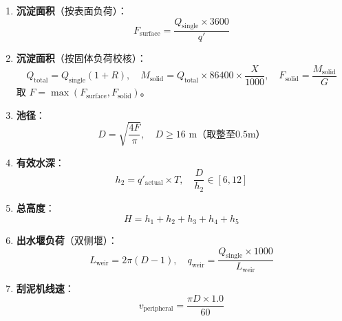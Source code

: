 \documentclass[12pt,a4paper]{ctexart}
\begin{document}
\begin{enumerate}[label=(\arabic*), leftmargin=*]
    \item \textbf{沉淀面积}（按表面负荷）：
    \begin{equation}
        F_{\text{surface}} = \frac{Q_{\text{single}} \times 3600}{q'}
    \end{equation}

    \item \textbf{沉淀面积}（按固体负荷校核）：
    \begin{equation}
        Q_{\text{total}} = Q_{\text{single}}(1 + R), \quad
        M_{\text{solid}} = Q_{\text{total}} \times 86400 \times \frac{X}{1000}, \quad
        F_{\text{solid}} = \frac{M_{\text{solid}}}{G}
    \end{equation}
    取 $F = \max(F_{\text{surface}}, F_{\text{solid}})$。

    \item \textbf{池径}：
    \begin{equation}
        D = \sqrt{\frac{4F}{\pi}}, \quad D \geq 16\text{ m（取整至0.5m）}
    \end{equation}

    \item \textbf{有效水深}：
    \begin{equation}
        h_2 = q'_{\text{actual}} \times T, \quad
        \frac{D}{h_2} \in [6, 12]
    \end{equation}

    \item \textbf{总高度}：
    \begin{equation}
        H = h_1 + h_2 + h_3 + h_4 + h_5
    \end{equation}

    \item \textbf{出水堰负荷}（双侧堰）：
    \begin{equation}
        L_{\text{weir}} = 2\pi(D - 1), \quad
        q_{\text{weir}} = \frac{Q_{\text{single}} \times 1000}{L_{\text{weir}}}
    \end{equation}

    \item \textbf{刮泥机线速}：
    \begin{equation}
        v_{\text{peripheral}} = \frac{\pi D \times 1.0}{60}
    \end{equation}
\end{enumerate}
\end{document}
